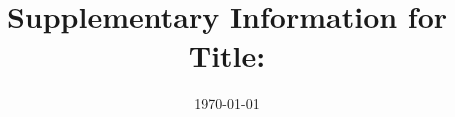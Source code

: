 \documentclass[aps,prl,preprint,superscriptaddress]{revtex4-1}
\begin{document}
\title{Supplementary Information for Title: }



\date{\today}



\pacs{}

\maketitle

\newpage


\end{document}
